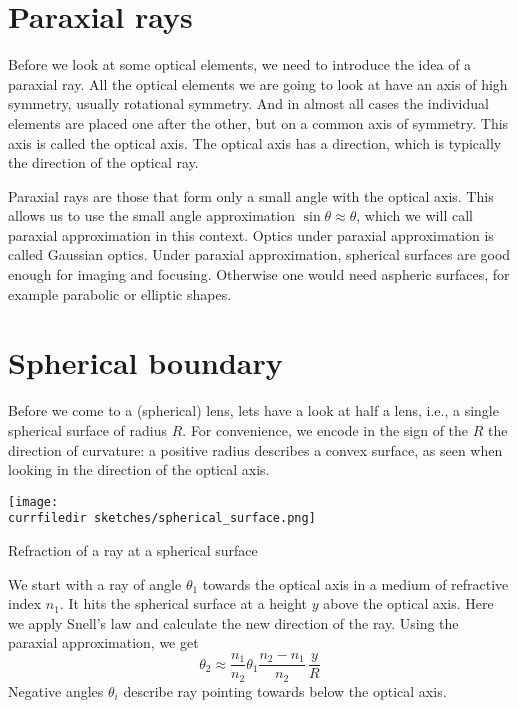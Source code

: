 \section{Paraxial rays}

Before we look at some optical elements, we need to introduce the idea of a paraxial ray. All the optical elements we are going to look at have an axis of high symmetry, usually rotational symmetry. And in almost all cases the individual elements are placed one after the other, but on a common axis of symmetry. This axis is called the optical axis. The optical axis has a direction, which is typically the direction of the optical ray.

Paraxial rays are those that form only a small angle with the optical axis. This allows us to use the small angle approximation $\sin \theta \approx \theta$, which we will call paraxial approximation in this context. Optics under paraxial approximation is called Gaussian optics. Under paraxial approximation, spherical surfaces are good enough for imaging and focusing. Otherwise one would need aspheric surfaces, for example parabolic or elliptic shapes.


\section{Spherical boundary}

Before we come to a (spherical) lens, lets have a look at half a lens, i.e., a single spherical surface of radius $R$. For convenience, we encode in the sign of the $R$ the direction of curvature: a positive radius describes a convex surface, as seen when looking in the direction of the optical axis.

\begin{marginfigure}
    \texttt{[image: \\currfiledir sketches/spherical\_surface.png]}
   \caption{Refraction of  a ray at a spherical surface}
\end{marginfigure}

We start with a ray of angle $\theta_1$ towards the optical axis in a medium of refractive index $n_1$. It hits the spherical surface at a height $y$ above the optical axis. Here we apply Snell's law and calculate the new direction of the ray. Using the paraxial approximation, we get
\begin{equation}
    \theta_2 \approx \frac{n_1}{n_2} \theta_1  \frac{n_2 - n_1}{n_2} \, \frac{y}{R}
    \label{eq:1_single_spherical_surface}
\end{equation}
Negative angles $\theta_i$ describe ray pointing towards below the optical axis.


